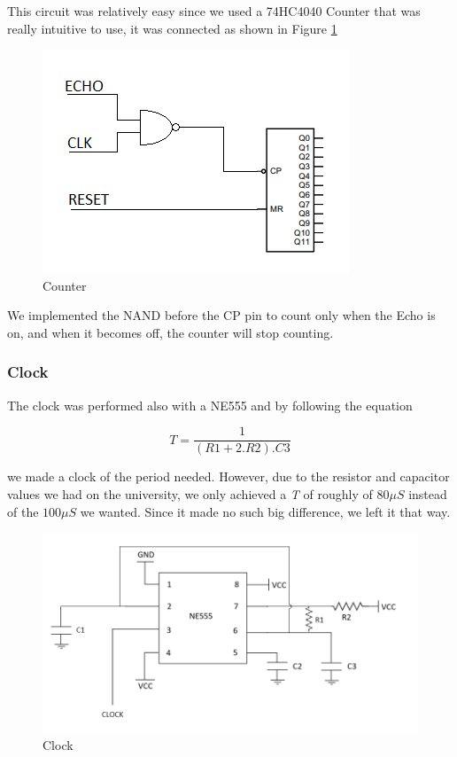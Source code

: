 This circuit was relatively easy since we used a 74HC4040 Counter
that was really intuitive to use, it was connected as shown in Figure
\ref{8_7}

\begin{figure}[H]
\begin{centering}
\includegraphics[scale=0.7]{images/COUNTER}
\par\end{centering}
\caption{Counter}
\label{8_7}

\end{figure}

We implemented the NAND before the CP pin to count only when the Echo
is on, and when it becomes off, the counter will stop counting.

\subsubsection{Clock}

The clock was performed also with a NE555 and by following the equation

\[
T=\frac{1}{(R1+2.R2).C3}
\]

we made a clock of the period needed. However, due to the resistor
and capacitor values we had on the university, we only achieved a
\emph{T} of roughly of $80\mu S$ instead of the $100\mu S$ we wanted.
Since it made no such big difference, we left it that way.

\begin{figure}[H]
\begin{centering}
\includegraphics[scale=0.5]{images/CLOCK}
\par\end{centering}
\caption{Clock}

\end{figure}

